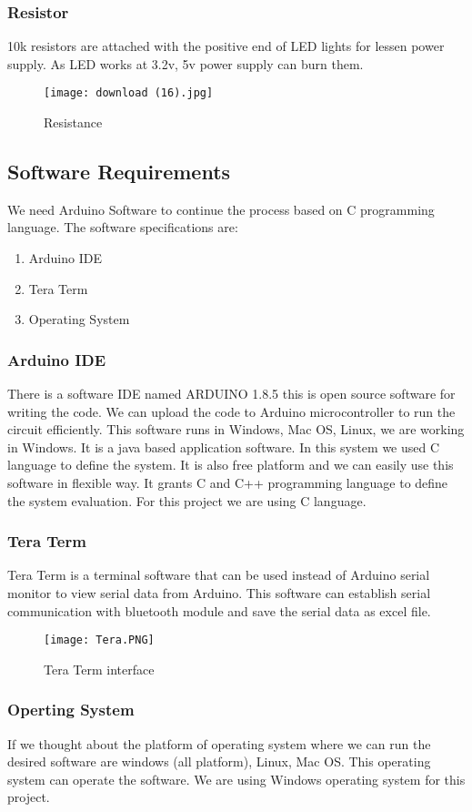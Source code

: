 \documentclass[12pt, top = 1 inch, bottom = 1 inch, left = 1.2 inch, top = .8 inch]{book}
\begin{document}
			\subsubsection{Resistor}
			10k resistors are attached with the positive end of LED lights for lessen power supply. As LED works at 3.2v, 5v power supply can burn them.   
			\begin{figure}[h!]	
				\centering
				\texttt{[image: download (16).jpg]}
				\caption{Resistance}
			\end{figure}
			\newpage
			\subsection{Software Requirements}
			We need Arduino Software to continue the process based on C programming language. The software specifications are:
			\begin{enumerate}
				\item Arduino IDE
				\item Tera Term
				\item Operating System
			\end{enumerate}
			\subsubsection{Arduino IDE}
			There is a software IDE named ARDUINO 1.8.5 this is open source software for writing the code. We can upload the code to Arduino microcontroller to run the circuit efficiently. This software runs in Windows, Mac OS, Linux, we are working in Windows. It is a java based application software. In this system we used C language to define the system. It is also free platform and we can easily use this software in flexible way. It grants C and C++ programming language to define the system evaluation. For this project we are using C language.
			\subsubsection{Tera Term}
			Tera Term is a terminal software that can be used instead of Arduino serial monitor to  view serial data from Arduino. This software can establish serial communication with bluetooth module and save the serial data as excel file.
			\begin{figure}[h!]	
				\centering
				\texttt{[image: Tera.PNG]}
				\caption{Tera Term interface}
			\end{figure}
			\newpage
			\subsubsection{Operting System}
			If we thought about the platform of operating system where we can run the desired software are windows (all platform), Linux, Mac OS. This operating system can operate the software. We are using Windows operating system for this project.
\end{document}
